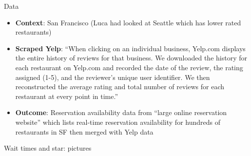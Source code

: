 \documentclass{beamer}
\begin{document}
\begin{frame}{Data}

\begin{itemize}
\item \textbf{Context}: San Francisco (Luca had looked at Seattle which has lower rated restaurants)
\item \textbf{Scraped Yelp}: ``When clicking on an individual business, Yelp.com displays the entire history of reviews for that business.  We downloaded the history for each restaurant on Yelp.com and recorded the date of the review, the rating assigned (1-5), and the reviewer's unique user identifier. We then reconstructed the average rating and total number of reviews for each restaurant at every point in time.''
\item \textbf{Outcome}: Reservation availability data from ``large online reservation website'' which lists real-time reservation availability for hundreds of restaurants in SF then merged with Yelp data

\end{itemize}

\end{frame}

\begin{frame}{Wait times and star: pictures}
	
	\begin{figure}
	\end{figure}

	
\end{frame}
\end{document}
